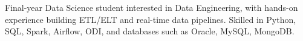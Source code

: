 \small{Final-year Data Science student interested in Data Engineering, with hands-on experience building ETL/ELT and real-time data pipelines. Skilled in Python, SQL, Spark, Airflow, ODI, and databases such as Oracle, MySQL, MongoDB.}

\vspace{2pt}


\vspace{-6pt}
